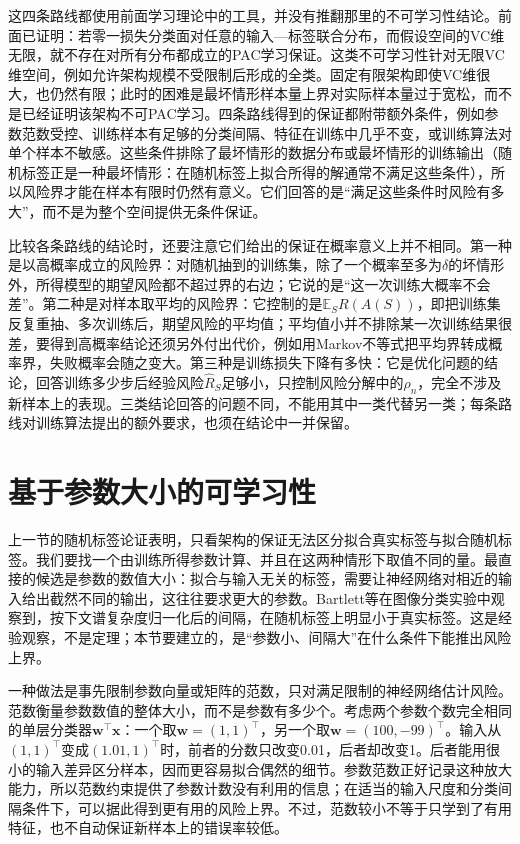这四条路线都使用前面学习理论中的工具，并没有推翻那里的不可学习性结论。前面已证明：若零一损失分类面对任意的输入—标签联合分布，而假设空间的VC维无限，就不存在对所有分布都成立的PAC学习保证。这类不可学习性针对无限VC维空间，例如允许架构规模不受限制后形成的全类。固定有限架构即使VC维很大，也仍然有限；此时的困难是最坏情形样本量上界对实际样本量过于宽松，而不是已经证明该架构不可PAC学习。四条路线得到的保证都附带额外条件，例如参数范数受控、训练样本有足够的分类间隔、特征在训练中几乎不变，或训练算法对单个样本不敏感。这些条件排除了最坏情形的数据分布或最坏情形的训练输出（随机标签正是一种最坏情形：在随机标签上拟合所得的解通常不满足这些条件），所以风险界才能在样本有限时仍然有意义。它们回答的是“满足这些条件时风险有多大”，而不是为整个空间提供无条件保证。

比较各条路线的结论时，还要注意它们给出的保证在概率意义上并不相同。第一种是以高概率成立的风险界：对随机抽到的训练集，除了一个概率至多为$\delta$的坏情形外，所得模型的期望风险都不超过界的右边；它说的是“这一次训练大概率不会差”。第二种是对样本取平均的风险界：它控制的是$\mathbb E_S R(A(S))$，即把训练集反复重抽、多次训练后，期望风险的平均值；平均值小并不排除某一次训练结果很差，要得到高概率结论还须另外付出代价，例如用Markov不等式把平均界转成概率界，失败概率会随之变大。第三种是训练损失下降有多快：它是优化问题的结论，回答训练多少步后经验风险$\hat R_S$足够小，只控制风险分解中的$\rho_n$，完全不涉及新样本上的表现。三类结论回答的问题不同，不能用其中一类代替另一类；每条路线对训练算法提出的额外要求，也须在结论中一并保留。

\section{基于参数大小的可学习性}
\label{sec:network-norm-bounds}

上一节的随机标签论证表明，只看架构的保证无法区分拟合真实标签与拟合随机标签。我们要找一个由训练所得参数计算、并且在这两种情形下取值不同的量。最直接的候选是参数的数值大小：拟合与输入无关的标签，需要让神经网络对相近的输入给出截然不同的输出，这往往要求更大的参数。Bartlett等在图像分类实验中观察到，按下文谱复杂度归一化后的间隔，在随机标签上明显小于真实标签。这是经验观察，不是定理；本节要建立的，是“参数小、间隔大”在什么条件下能推出风险上界。

一种做法是事先限制参数向量或矩阵的范数，只对满足限制的神经网络估计风险。范数衡量参数数值的整体大小，而不是参数有多少个。考虑两个参数个数完全相同的单层分类器$\bm w^\top\bm x$：一个取$\bm w=(1,1)^\top$，另一个取$\bm w=(100,-99)^\top$。输入从$(1,1)^\top$变成$(1.01,1)^\top$时，前者的分数只改变0.01，后者却改变1。后者能用很小的输入差异区分样本，因而更容易拟合偶然的细节。参数范数正好记录这种放大能力，所以范数约束提供了参数计数没有利用的信息；在适当的输入尺度和分类间隔条件下，可以据此得到更有用的风险上界。不过，范数较小不等于只学到了有用特征，也不自动保证新样本上的错误率较低。

